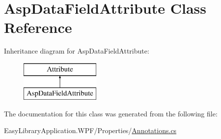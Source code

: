 \hypertarget{class_asp_data_field_attribute}{}\section{Asp\+Data\+Field\+Attribute Class Reference}
\label{class_asp_data_field_attribute}
Inheritance diagram for Asp\+Data\+Field\+Attribute\+:\begin{figure}[H]
\begin{center}
\leavevmode
\includegraphics[height=2.000000cm]{class_asp_data_field_attribute}
\end{center}
\end{figure}


The documentation for this class was generated from the following file\+:\begin{DoxyCompactItemize}
\item 
Easy\+Library\+Application.\+W\+P\+F/\+Properties/\mbox{\hyperlink{_annotations_8cs}{Annotations.\+cs}}\end{DoxyCompactItemize}
